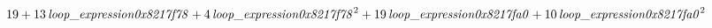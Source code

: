 \documentclass{article}
\begin{document}






\begin{displaymath}
19+13\,{\it loop\_expression0x8217f78}+4\,{{\it loop\_expression0x8217f78}}^{2}+19\,{\it loop\_expression0x8217fa0}+10\,{{\it loop\_expression0x8217fa0}}^{2}
\end{displaymath}
\end{document}
